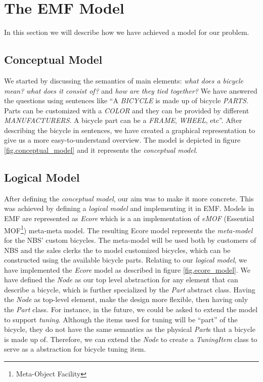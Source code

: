 \section{The EMF Model}
\label{sec.logical_model}
In this section we will describe how we have achieved a model for our problem.

\subsection{Conceptual Model}
\noindent We started by discussing the semantics of main elements: \emph{what
does a bicycle mean?} \emph{what does it consist of?} and \emph{how are they
tied together?} We have answered the questions using sentences like ``A
\emph{BICYCLE} is made up of bicycle \emph{PARTS}. Parts can be customized with
a \emph{COLOR} and they can be provided by different \emph{MANUFACTURERS}.
A bicycle part can be a \emph{FRAME}, \emph{WHEEL}, etc''. After describing the
bicycle in sentences, we have created a graphical representation to give us a
more easy-to-understand overview. The model is depicted in figure
\ref{fig.conceptual_model} and it represents the \emph{conceptual model}.

\subsection{Logical Model}
\noindent After defining the \emph{conceptual model}, our aim was to make it
more concrete. This was achieved by defining a \emph{logical model} and
implementing it in EMF. Models in EMF are represented as \emph{Ecore} which is a
an implementation of \emph{eMOF} (Essential MOF\footnote{Meta-Object Facility})
meta-meta model. The resulting Ecore model represents the \emph{meta-model} for
the NBS' custom bicycles. The meta-model will be used both by customers of NBS and the sales
clerks the to model customized bicycles, which can be constructed using the
available bicycle parts. Relating to our \emph{logical model}, we have
implemented the \emph{Ecore} model as described in figure \ref{fig.ecore_model}.
We have defined the \emph{Node} as our top level abstraction for any element
that can describe a bicycle, which is further specialized by the \emph{Part}
abstract class. Having the \emph{Node} as top-level element, make the design
more flexible, then having only the \emph{Part} class. For instance,  in the
future, we could be asked to extend the model to support \emph{tuning}. Although
the items used for tuning will be ``part'' of the bicycle, they do not have the
same semantics as the physical \emph{Part}s that a bicycle is made up of.
Therefore, we can extend the \emph{Node} to create a \emph{TuningItem} class to
serve as a abstraction for bicycle tuning item.\\

